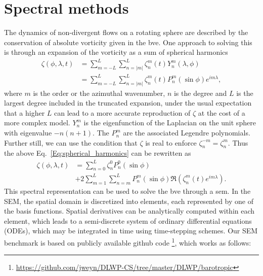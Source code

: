 \documentclass[aps,pra,a4paper,twocolumn,longbibliography,groupedaddress]{revtex4-2}
\begin{document}
\section{Spectral methods}
\label{app:spectral}

The dynamics of non-divergent flows on a rotating sphere are described by the conservation of absolute vorticity given in the \gls{bve}. One approach to solving this is through an expansion of the vorticity as a sum of spherical harmonics
\begin{equation}
\begin{split}
    \zeta(\phi, \lambda, t) &= \sum_{m=-L}^{L}\sum_{n=|m|}^{L} \zeta^m_n(t)Y^m_n(\lambda, \phi) \\
 &= \sum_{m=-L}^{L}\sum_{n = |m|}^{L} \zeta^m_n(t) P^m_n(\sin\phi)e^{im\lambda},
    \label{Eq:spherical_harmonics}
    \end{split}
\end{equation}
where $m$ is the order or the azimuthal wavenumber, $n$ is the degree and $L$ is the largest degree {included in the truncated expansion, under the usual expectation that a higher $L$ can lead to a more accurate reproduction of $\zeta$ at the cost of a more complex model}.  $Y^m_n$ is the eigenfunction of the Laplacian on the unit sphere with eigenvalue $-n(n+1)$. The $P^m_n$ are the associated Legendre polynomials. Further still, we can use the condition that $\zeta$ is real to enforce $\zeta^{-m}_n = \zeta^{m}_n$. Thus the above Eq.~\eqref{Eq:spherical_harmonics} can be rewritten as
\begin{equation}
\begin{split}
    \zeta(\phi, \lambda, t) &= \sum_{n=0}^{L}\zeta_{n}^0 P_{n}^0(\sin \phi) \\ &+2\sum_{m=1}^{L}\sum_{n=m}^{L}P_{n}^m(\sin\phi)\Re(\zeta_{n}^m(t)e^{im\lambda}).
    \label{Eq:spherical_harmonics 2}
    \end{split}
\end{equation}
This spectral representation can be used to solve the \gls{bve} through a \gls{sem}. In the SEM, the spatial domain is discretized into elements, each represented by one of the basis functions. Spatial derivatives can be analytically computed within each element, which leads to a semi-discrete system of ordinary differential equations (ODEs), which may be integrated in time using time-stepping schemes. Our SEM benchmark is based on publicly available github code \footnote{ \url{https://github.com/jweyn/DLWP-CS/tree/master/DLWP/barotropic}
}, which works as follows:
\end{document}
